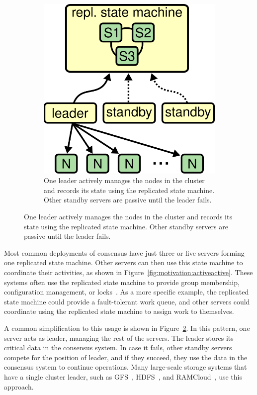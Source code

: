 \begin{figure}
\begin{subfigure}{.45\textwidth}
\includegraphics[scale=.5]{motivation/activepassive}
\caption{
One leader actively manages the nodes in the cluster and records its
state using the replicated state machine. Other standby servers are
passive until the leader fails.
}
\label{fig:motivation:activepassive}
\end{subfigure}
\hfill
{}
\end{figure}


Most common deployments of consensus have just three or five servers
forming one replicated state machine. Other servers can then use this
state machine to coordinate their activities, as shown in
Figure~\ref{fig:motivation:activeactive}. These systems often use the
replicated state machine to provide
group membership, configuration management, or locks~\cite{Hunt:2010}.
As a more specific example, the replicated state machine could provide a
fault-tolerant work queue, and other servers could coordinate using the
replicated state machine to assign work to themselves.

A common simplification to this usage is shown in
Figure~\ref{fig:motivation:activepassive}. In this pattern, one
server acts as leader, managing the rest of the servers.
The leader stores its critical data in the consensus system.
In case it fails, other standby servers compete for the position of
leader, and if they succeed, they use the data in the consensus system
to continue operations.
Many large-scale storage systems that have a single cluster leader, such as
GFS~\cite{Ghemawat:2003}, HDFS~\cite{Shvachko:2010}, and
RAMCloud~\cite{Ousterhout:2011}, use this approach.

